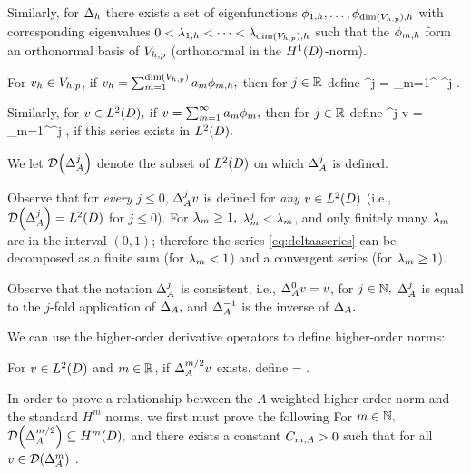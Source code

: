 Similarly, for $\Delta_{h}$ there exists a set of eigenfunctions $\phioh,\ldots,\phidimVhph$  with corresponding eigenvalues $0 < \lambdaoh < \cdots < \lambdadimVhph$ such that the $\phi_{m,h}$ form an orthonormal basis of $V_{h,p}$ (orthonormal in the $\HoD$-norm).

For $v_{h} \in V_{h,p}$, if $\vh = \sum_{m=1}^{\dimVhp} \am \phimh,$ then for $j \in \mathbb R$ define
\beqs
\Deltah^j \vh = \sum_{m=1}^{\dimVhp} \lambdamh^j \am \phimh.
\eeqs

Similarly, for $v \in \LtD,$ if $v = \sum_{m=1}^\infty a_{m} \phi_{m},$ then for $j \in \mathbb R$ define
\beq\label{eq:deltaaseries}
\DeltaA^j v = \sum_{m=1}^\infty \lambdam^j \am \phim,
\eeq
if this series exists in $\LtD.$
\ede

We let $\Domain{\DeltaA^j}$ denote the subset of $\LtD$ on which $\Delta_{A}^j$ is defined.

Observe that for \emph{every} $j \leq 0$, $\Delta_{A}^j v$ is defined for \emph{any} $v \in \LtD$ (i.e., $\Domain{\DeltaA^{j}} = \LtD$ for $j \leq 0$). For $\lambda_{m} \geq 1,$ $\lambda_{m}^j < \lambda_{m}$, and only finitely many $\lambda_{m}$ are in the interval $(0,1)$; therefore the series \cref{eq:deltaaseries} can be decomposed as a finite sum (for $\lambda_{m} < 1$) and a convergent series (for $\lambda_{m} \geq 1$).
\ere

Observe that the notation $\Delta_{A}^j$ is consistent, i.e., $\Delta_{A}^0 v = v$, for $j \in \mathbb N,$ $\Delta_{A}^j$ is equal to the $j$-fold application of $\Delta_{A},$ and $\Delta_{A}^{-1}$ is the inverse of $\Delta_{A}.$
\ere

We can use the higher-order derivative operators to define higher-order norms:

For $v \in \LtD$ and $m \in \mathbb R$, if $\Delta_{A}^{m/2} v$ exists, define
\beqs
{} = .
\eeqs
\ede

In order to prove a relationship between the $A$-weighted higher order norm and the standard $H^m$ norms, we first must prove the following 
\label{lem:normrelationshiptech}
For $m \in \mathbb N,$ $\Domain{\DeltaA^{m/2}} \subseteq \HmD,$ and there exists a constant $C_{m,A} > 0$ such that for all $v \in \Domain{\DeltaA^{m}}$
\beqs
{} \leq \Cma {}.
\eeqs{}
\ele


